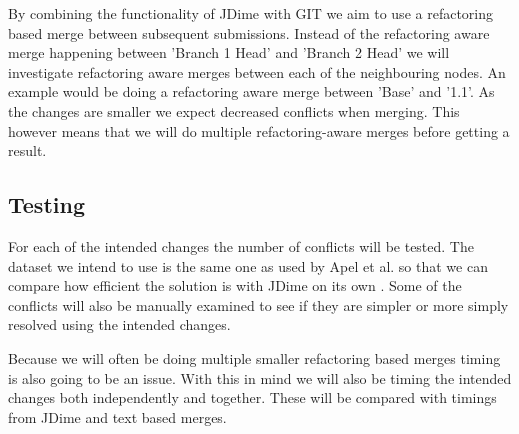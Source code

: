 \documentclass[12pt]{CRPITStyle}
\renewcommand{\cite}{\citep}
\begin{document}
By combining the functionality of JDime with GIT we aim to use a refactoring based merge between subsequent submissions. Instead of the refactoring aware merge happening between 'Branch 1 Head' and 'Branch 2 Head' we will investigate refactoring aware merges between each of the neighbouring nodes. An example would be doing a refactoring aware merge between 'Base' and '1.1'. As the changes are smaller we expect decreased conflicts when merging. This however means that we will do multiple refactoring-aware merges before getting a result.

\subsection{Testing}

For each of the intended changes the number of conflicts will be tested. The dataset we intend to use is the same one as used by Apel et al. so that we can compare how efficient the solution is with JDime on its own \cite{Apel2011}. Some of the conflicts will also be manually examined to see if they are simpler or more simply resolved using the intended changes. 

Because we will often be doing multiple smaller refactoring based merges timing is also going to be an issue. With this in mind we will also be timing the intended changes both independently and together. These will be compared with timings from JDime and text based merges.



\end{document}
